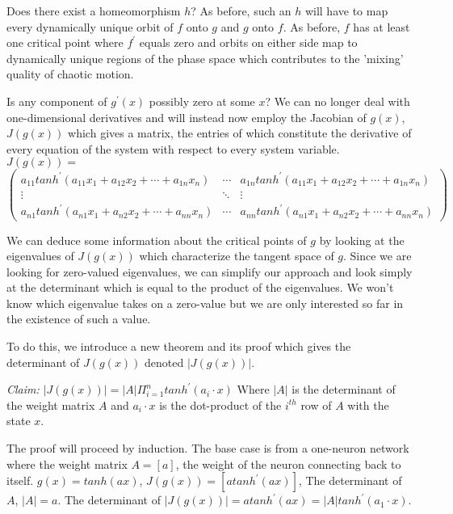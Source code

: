 \documentclass[12pt]{article}
\begin{document}
Does there exist a homeomorphism $h$?  As before, such an $h$ will have to 
map every dynamically unique orbit of $f$ onto $g$ and $g$ onto $f$.  As 
before, $f$ has at least one critical point where $f^{\prime}$ equals zero and
orbits on either side map to dynamically unique regions of the phase space which
contributes to the 'mixing' quality of chaotic motion.

Is any component of $g^{\prime}(x)$ possibly zero at some $x$?  We can no
longer deal with one-dimensional derivatives and will instead now employ the 
Jacobian of
$g(x)$, $J(g(x))$ which gives a matrix, the entries of which constitute the 
derivative
of every equation of the system with respect to every system 
variable.  $J(g(x)) =$
\[ \left( \begin{array}{ccc}
a_{11}tanh^{\prime}(a_{11}x_{1} + a_{12}x_{2} + \cdots + a_{1n}x_{n}) &
\cdots &
a_{1n}tanh^{\prime}(a_{11}x_{1} + a_{12}x_{2} + \cdots + a_{1n}x_{n}) \\ 

\vdots & \ddots & \vdots \\

a_{n1}tanh^{\prime}(a_{n1}x_{1} + a_{n2}x_{2} + \cdots + a_{nn}x_{n}) &
\cdots &
a_{nn}tanh^{\prime}(a_{n1}x_{1} + a_{n2}x_{2} + \cdots + a_{nn}x_{n}) 
\end{array} \right)\]

We can deduce some information about the critical points of $g$ by looking
at the eigenvalues of $J(g(x))$ which characterize the tangent space of $g$.
Since we are looking for zero-valued eigenvalues, we can simplify our approach
and look simply at the determinant which is equal to the product of the
eigenvalues.  We won't know which eigenvalue takes on a zero-value but we
are only interested so far in the existence of such a value.

To do this, we introduce a new theorem and its proof which gives the 
determinant of $J(g(x))$ denoted $|J(g(x))|$.

\textit{Claim:} $|J(g(x))| = |A| \Pi_{i=1}^{n}tanh^{\prime}(a_{i} \cdot x)$
Where $|A|$ is the determinant of the weight matrix $A$ and $a_{i} \cdot x$
is the dot-product of the $i^{th}$ row of $A$ with the state $x$.

The proof will proceed by induction.  The base case is from a one-neuron
network where the weight matrix $A = [a]$, the weight of the neuron connecting
back to itself.  $g(x) = tanh(ax)$, $J(g(x)) = [a tanh^{\prime}(a x)]$,
The determinant of $A$, $|A|=a$.  The determinant of 
$|J(g(x))|=a tanh^{\prime}(a x)=|A| tanh^{\prime}( a_{1} \cdot x )$.
\end{document}
